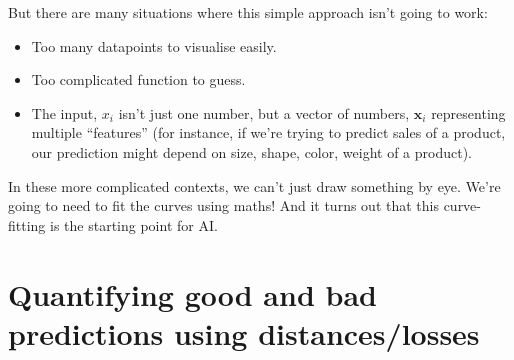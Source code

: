 \documentclass{article}
\newcommand{\x}{\mathbf{x}}
\begin{document}
But there are many situations where this simple approach isn't going to work:
\begin{itemize}
  \item Too many datapoints to visualise easily.
  \item Too complicated function to guess.
  \item The input, $x_i$ isn't just one number, but a vector of numbers, $\x_i$ representing multiple ``features'' (for instance, if we're trying to predict sales of a product, our prediction might depend on size, shape, color, weight of a product).
\end{itemize}
In these more complicated contexts, we can't just draw something by eye.
We're going to need to fit the curves using maths!
And it turns out that this curve-fitting is the starting point for AI.

\section{Quantifying good and bad predictions using distances/losses}
\end{document}
